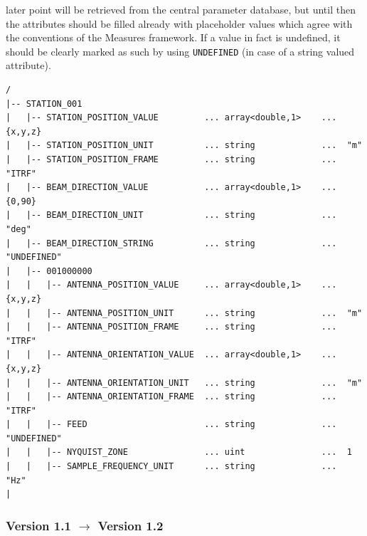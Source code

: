 \documentclass[a4paper,10pt,bibtotoc]{scrartcl}
\begin{document}
\begin{enumerate}
  later point will be retrieved from the central parameter database, but until then
  the attributes should be filled already with placeholder values which agree with
  the conventions of the Measures framework. If a value in fact is undefined, it
  should be clearly marked as such by using \verb|UNDEFINED| (in case of a string
  valued attribute).
  {\small
\begin{verbatim}
/
|-- STATION_001
|   |-- STATION_POSITION_VALUE         ... array<double,1>    ...  {x,y,z}
|   |-- STATION_POSITION_UNIT          ... string             ...  "m"
|   |-- STATION_POSITION_FRAME         ... string             ...  "ITRF"
|   |-- BEAM_DIRECTION_VALUE           ... array<double,1>    ...  {0,90}
|   |-- BEAM_DIRECTION_UNIT            ... string             ...  "deg"
|   |-- BEAM_DIRECTION_STRING          ... string             ...  "UNDEFINED"
|   |-- 001000000
|   |   |-- ANTENNA_POSITION_VALUE     ... array<double,1>    ...  {x,y,z}
|   |   |-- ANTENNA_POSITION_UNIT      ... string             ...  "m"
|   |   |-- ANTENNA_POSITION_FRAME     ... string             ...  "ITRF"
|   |   |-- ANTENNA_ORIENTATION_VALUE  ... array<double,1>    ...  {x,y,z}
|   |   |-- ANTENNA_ORIENTATION_UNIT   ... string             ...  "m"
|   |   |-- ANTENNA_ORIENTATION_FRAME  ... string             ...  "ITRF"
|   |   |-- FEED                       ... string             ...  "UNDEFINED"
|   |   |-- NYQUIST_ZONE               ... uint               ...  1
|   |   |-- SAMPLE_FREQUENCY_UNIT      ... string             ...  "Hz"
|
\end{verbatim}}
\end{enumerate}

\subsubsection*{Version 1.1 $\rightarrow$ Version 1.2}
\end{document}

